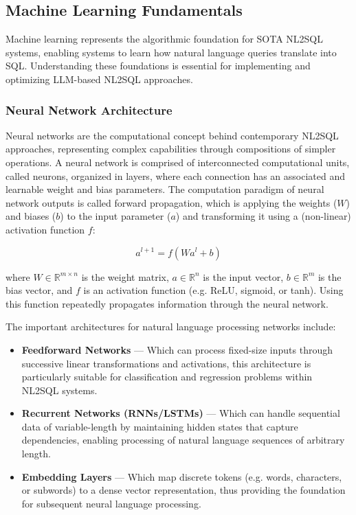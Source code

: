 \subsection{Machine Learning Fundamentals}

Machine learning represents the algorithmic foundation for SOTA NL2SQL systems,
enabling systems to learn how natural language queries translate into SQL.
Understanding these foundations is essential for implementing and optimizing
LLM-based NL2SQL approaches.

\subsubsection{Neural Network Architecture}

Neural networks are the computational concept behind contemporary NL2SQL
approaches, representing complex capabilities through compositions of simpler
operations. A neural network is comprised of interconnected computational
units, called neurons, organized in layers, where each connection has an
associated and learnable weight and bias parameters. The
computation paradigm of neural network outputs is called
forward propagation, which is applying the weights ($W$) and
biases ($b$) to the input parameter ($a$) and transforming
it using a (non-linear) activation function $f$:

\begin{equation}
a^{l+1} = f(Wa^l + b)
\end{equation}

where $W \in \mathbb{R}^{m \times n}$ is the weight matrix, $a \in
\mathbb{R}^{n}$ is the input vector, $b \in \mathbb{R}^{m}$ is the bias vector,
and $f$ is an activation function (e.g. ReLU, sigmoid, or tanh). Using this
function repeatedly propagates information through the neural network.

The important architectures for natural language processing networks include:

\begin{itemize}
    \item \textbf{Feedforward Networks} — Which can process fixed-size inputs
        through successive linear transformations and activations, this
        architecture is particularly suitable for classification and regression
        problems within NL2SQL systems.
    \item \textbf{Recurrent Networks (RNNs/LSTMs)} — Which can handle
        sequential data of variable-length by maintaining hidden states that
        capture dependencies, enabling processing of natural language sequences
        of arbitrary length.
    \item \textbf{Embedding Layers} — Which map discrete tokens (e.g. words,
        characters, or subwords) to a dense vector representation, thus
        providing the foundation for subsequent neural language processing.
\end{itemize}

